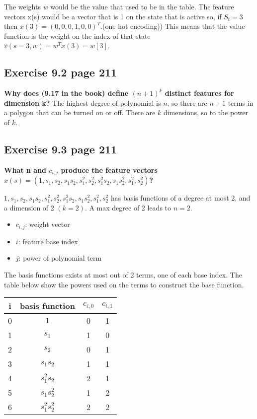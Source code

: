The weights $w$ would be the value that used to be in the table. The feature vectors x(s) would be a vector that is 1 on the state that is active so, if $S_t=3$ then $x(3) = (0, 0, 0, 1 , 0 , 0)^T$.(one hot encoding)) This means that the value function is the weight on the index of that state $\hat{v}(s=3, w)=w^Tx(3)=w[3]$.

\subsection{Exercise 9.2 page 211}
\textbf{Why does (9.17 in the book) define $(n+1)^k$ distinct features for dimension k?}
The highest degree of polynomial is $n$, so there are $n+1$ terms in a polygon that can be turned on or off. There are $k$ dimensions, so to the power of $k$.

\subsection{Exercise 9.3 page 211}
\textbf{What n and $c_{i,j}$ produce the feature vectors $x(s)=(1, s_1, s_2, s_1s_2, s_1^2,s_2^2,s_1^2s_2,s_1s_2^2,s_1^2,s_2^2)$?}

$1, s_1, s_2, s_1s_2, s_1^2,s_2^2,s_1^2s_2,s_1s_2^2,s_1^2,s_2^2$ has basis functions of a degree at most 2, and a dimension of 2 $(k=2)$. A max degree of 2 leads to $n=2$.

\begin{itemize}
	\item $c_{i,j}$: weight vector
	\item $i$: feature base index
	\item $j$: power of polynomial term
\end{itemize}

The basis functions exists at most out of 2 terms, one of each base index. The table below show the powers used on the terms to construct the base function.

\begin{center}
\begin{tabular}{c|c|c|c}
i & basis function & $c_{i,0}$ & $c_{i,1}$ \\
\hline
0 & $1$ & 0 & 1 \\
1 & $s_1$ & 1 & 0 \\
2 & $s_2$ & 0 & 1 \\
3 & $s_1s_2$ & 1 & 1 \\
4 & $s_1^2s_2$ & 2 & 1 \\
5 & $s_1s_2^2$ & 1 & 2 \\
6 & $s_1^2s_2^2$ & 2 & 2 \\
\end{tabular}
\end{center}

